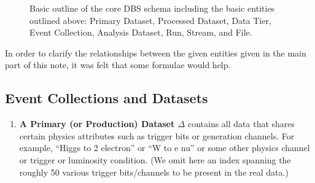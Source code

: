 \documentclass{cmspaper}
\begin{document}
{\begin{figure}[hbtp]
  \begin{center}
    \caption{Basic outline of the core DBS schema including the basic 
             entities outlined above: Primary Dataset, Processed Dataset, 
             Data Tier, Event Collection, Analysis Dataset, Run, Stream, and 
             File.} 
    \label{fig:highlevel}
  \end{center}
\end{figure}


In order to clarify the relationships between the given entities given
in the main part of this note, it was felt that some formulae would help.

\subsection{Event Collections and Datasets}

\begin{enumerate}

\item {\bf A Primary (or Production) Dataset $\Delta$} 
      contains all data that shares certain physics attributes such as
      trigger bits or generation channels.  For example, ``Higgs to
      2 electron'' or ``W to e nu'' or some other physics channel or
      trigger or luminosity condition.  (We omit here an index spanning
      the roughly 50 various trigger bits/channels to be present in the
      real data.)


\end{enumerate}}
\end{document}
